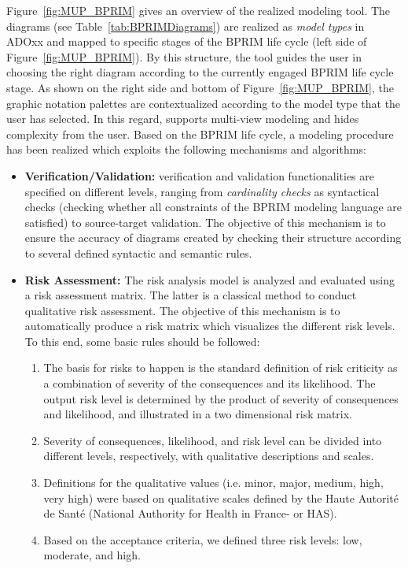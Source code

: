 \documentclass[preprint,3p,times,number]{elsarticle}
\begin{document}
Figure~\ref{fig:MUP_BPRIM} gives an overview of the realized \adobprim{} modeling tool. The \adobprim{} diagrams (see Table~\ref{tab:BPRIMDiagrams}) are realized as \emph{model types} in ADOxx and mapped to specific stages of the BPRIM life cycle (left side of Figure~\ref{fig:MUP_BPRIM}). By this structure, the \adobprim{} tool guides the user in choosing the right diagram according to the currently engaged BPRIM life cycle stage. As shown on the right side and bottom of Figure~\ref{fig:MUP_BPRIM}, the graphic notation palettes are contextualized according to the model type that the user has selected. In this regard, \adobprim{} supports multi-view modeling and hides complexity from the user. Based on the BPRIM life cycle, a modeling procedure has been realized which exploits the following mechanisms and algorithms:
\begin{itemize}
\item \textbf{Verification/Validation:} verification and validation functionalities are specified on different levels, ranging from \emph{cardinality checks} as syntactical checks (checking whether all constraints of the BPRIM modeling language are satisfied) to source-target validation. The objective of this mechanism is to ensure the accuracy of diagrams created by checking their structure according to several defined syntactic and semantic rules. 
\item \textbf{Risk Assessment:} The risk analysis model is analyzed and evaluated using a risk assessment matrix. The latter is a classical method to conduct qualitative risk assessment. The objective of this mechanism is to automatically produce a risk matrix which visualizes the different risk levels. To this end, some basic rules should be followed:
\begin{enumerate}
\item The basis for risks to happen is the standard definition of risk criticity as a combination of severity of the consequences and its likelihood. The output risk level is determined by the product of severity of consequences and likelihood, and illustrated in a two dimensional risk matrix.
\item Severity of consequences, likelihood, and risk level can be divided into different levels, respectively, with qualitative descriptions and scales. 
\item Definitions for the qualitative values (i.e. minor, major, medium, high, very high) were based on qualitative scales defined by the Haute Autorité de Santé (National Authority for Health in France- or HAS).
\item Based on the acceptance criteria, we defined three risk levels: low, moderate, and high.
\end{enumerate}
\end{itemize}
\end{document}
